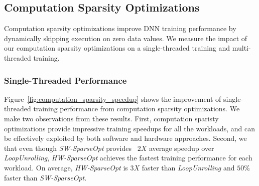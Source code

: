            

   
\subsection{Computation Sparsity Optimizations}
\label{subsec:perf_computation_sparsity}
Computation sparsity optimizations improve DNN training performance by dynamically skipping execution on zero data values.  We measure the impact of our computation sparsity optimizations on a single-threaded training and multi-threaded training. 

\subsubsection{Single-Threaded Performance}
Figure~\ref{fig:computation_sparsity_speedup} shows the improvement of single-threaded training performance from computation sparsity optimizations.  We make two observations from these results.  First, computation sparisty optimizations provide impressive training speedups for all the workloads, and can be effectively exploited by both software and hardware approaches.  Second, we that even though {\it SW-SparseOpt} provides ~$2X$ average speedup over {\it LoopUnrolling}, {\it HW-SparseOpt} achieves the fastest training performance for each workload.  On average, {\it HW-SparseOpt} is $3X$ faster than {\it LoopUnrolling} and $50\%$ faster than {\it SW-SparseOpt}.  

